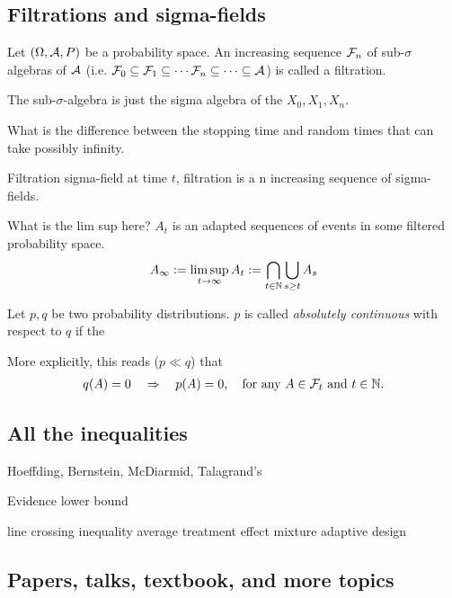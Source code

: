 \subsection{Filtrations and sigma-fields}

\begin{define}[Filtration]
    Let $(\Omega, \mathcal{A}, P)$ be a probability space. An increasing sequence $\mathcal{F}_n$ of sub-$\sigma$ algebras of $\mathcal{A}$ 
    (i.e. $\mathcal{F}_0 \subseteq \mathcal{F}_1 \subseteq \cdots \mathcal{F}_n \subseteq \cdots \subseteq \mathcal{A}$) is called a filtration.
\end{define}

The sub-$\sigma$-algebra is just the sigma algebra of the $X_0, X_1, X_n$.

What is the difference between the stopping time and random times that can take possibly infinity.

Filtration sigma-field at time $t$, filtration is a n increasing sequence of sigma-fields.

What is the lim sup here? $A_t$ is an adapted sequences of events in some filtered probability space.
$$
A_\infty := \limsup_{t\to \infty} A_t := \bigcap_{t\in\mathbb{N}}\bigcup_{s\geq t}A_s
$$

\begin{define}
    Let $p, q$ be two probability distributions. $p$ is called \emph{absolutely continuous} with respect to $q$ if the 

    More explicitly, this reads ($p \ll q$) that 
    \begin{align*}
        q(A) = 0 \quad \Rightarrow \quad p(A) = 0,  \quad \text{for any } A \in \Fc_t \text{ and } t \in \Nf.
    \end{align*}
\end{define}

\subsection{All the inequalities}

Hoeffding, Bernstein, McDiarmid, Talagrand's

Evidence lower bound

line crossing inequality
average treatment effect
mixture adaptive design

\subsection{Papers, talks, textbook, and more topics}

